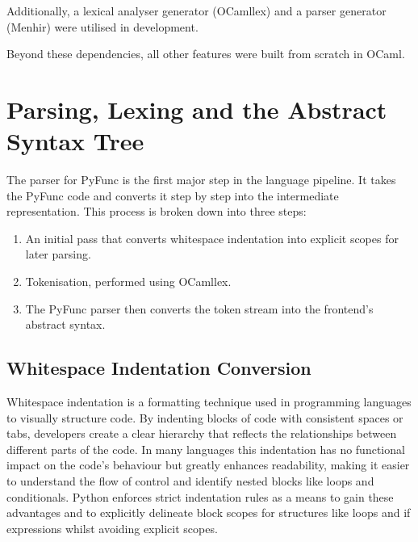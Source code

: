 \documentclass{l4proj}
\begin{document}
Additionally, a lexical analyser generator (OCamllex) and a parser generator (Menhir) were utilised in development.

Beyond these dependencies, all other features were built from scratch in OCaml.

\section{Parsing, Lexing and the Abstract Syntax Tree} \label{sec:parsing-lexing-and-the-ast}


The parser for PyFunc is the first major step in the language pipeline. It takes the PyFunc code and converts it step by step into the intermediate representation.
This process is broken down into three steps:
\begin{enumerate}
    \item An initial pass that converts whitespace indentation into explicit scopes for later parsing.
    \item Tokenisation, performed using OCamllex.
    \item The PyFunc parser then converts the token stream into the frontend's abstract syntax.
\end{enumerate}

\subsection{Whitespace Indentation Conversion}

Whitespace indentation is a formatting technique used in programming languages to visually structure code.
By indenting blocks of code with consistent spaces or tabs, developers create a clear hierarchy that reflects the relationships between different parts of the code.
In many languages this indentation has no functional impact on the code's behaviour but greatly enhances readability, making it easier to understand the flow of control and identify nested blocks like loops and conditionals.
Python enforces strict indentation rules as a means to gain these advantages and to explicitly delineate block scopes for structures like loops and if expressions whilst avoiding explicit scopes.
\end{document}
